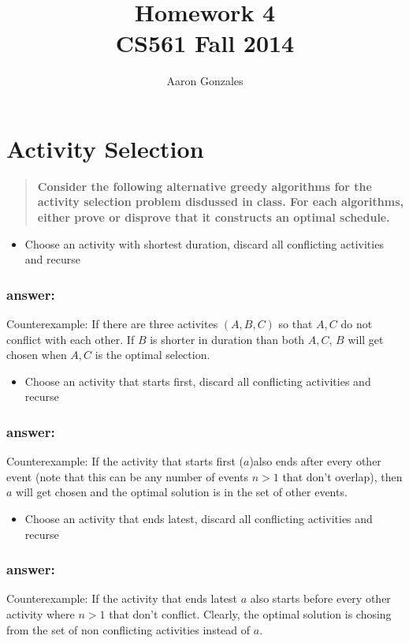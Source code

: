 \documentclass[titlepage]{article}\usepackage[]{graphicx}\usepackage[]{color}
\begin{document}
\title{Homework 4 \\ CS561 Fall 2014}
\author{Aaron Gonzales}
\maketitle


\section{Activity Selection}
\begin{quote}
  \textbf{ Consider the following alternative greedy algorithms for the
	activity selection problem disdussed in class. For each algorithms, either
  prove or disprove that it constructs an optimal schedule. }
\end{quote}

\begin{itemize}
  \item Choose an activity with shortest duration, discard all
	conflicting activities and recurse
\end{itemize}
\subsubsection{answer:}
Counterexample: If there are three activites $(A, B, C) $ so that $A, C$ do not
conflict with each other. If $B$ is shorter in duration than both $A, C$, $B$
will get chosen when $A,C$ is the optimal selection.

\begin{itemize}
  \item Choose an activity that starts first, discard all conflicting
	activities and recurse
\end{itemize}
\subsubsection{answer:}
Counterexample:
If the activity that starts first ($a$)also ends after every other event (note that
this can be any number of events $n > 1$ that don't overlap), then $a$ will get chosen and the
optimal solution is in the set of other events.

\begin{itemize}
  \item Choose an activity that ends latest, discard all conflicting
	activities and recurse
\end{itemize}
\subsubsection{answer:}
Counterexample:
If the activity that ends latest $a$ also starts before every other activity
where $n > 1$ that don't conflict. Clearly, the optimal solution is chosing
from the set of non conflicting activities instead of $a$.
\end{document}
